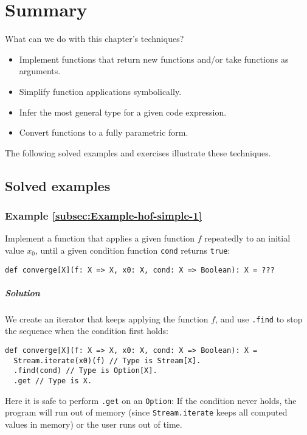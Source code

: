 \section{Summary}

What can we do with this chapter's techniques?
\begin{itemize}
\item Implement functions that return new functions and/or take functions
as arguments.
\item Simplify function applications symbolically.
\item Infer the most general type for a given code expression.
\item Convert functions to a fully parametric form.
\end{itemize}
The following solved examples and exercises illustrate these techniques.

\subsection{Solved examples}

\subsubsection{Example \label{subsec:Example-hof-simple-1}\ref{subsec:Example-hof-simple-1}}

Implement a function that applies a given function $f$ repeatedly
to an initial value $x_{0}$, until a given condition function \lstinline!cond!
returns \lstinline!true!:
\begin{lstlisting}
def converge[X](f: X => X, x0: X, cond: X => Boolean): X = ???
\end{lstlisting}

\subparagraph{Solution}

We create an iterator that keeps applying the function $f$, and use
\lstinline!.find! to stop
the sequence when the condition first holds:
\begin{lstlisting}
def converge[X](f: X => X, x0: X, cond: X => Boolean): X = 
  Stream.iterate(x0)(f) // Type is Stream[X].
  .find(cond) // Type is Option[X].
  .get // Type is X.
\end{lstlisting}
Here it is safe to perform \lstinline!.get!
on an \lstinline!Option!:
If the condition never holds, the program will run out of memory (since
\lstinline!Stream.iterate!
keeps all computed values in memory) or the user runs out of time.

